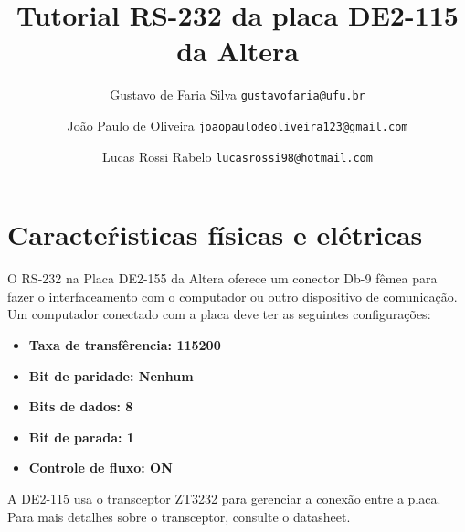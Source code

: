 \documentclass[12pt]{article} %
\begin{document}
\title{Tutorial RS-232 da placa DE2-115 da Altera\vspace{3.5cm}} %

\author{
	Gustavo de Faria Silva
	\texttt{gustavofaria@ufu.br}
	\and
	João Paulo de Oliveira
	\texttt{joaopaulodeoliveira123@gmail.com}
	\and
	Lucas Rossi Rabelo
	\texttt{lucasrossi98@hotmail.com}
	\vspace*{10cm}
}

%
\maketitle %


\tableofcontents %
\pagebreak %
\section*{Caracteŕisticas físicas e elétricas}
O RS-232 na Placa DE2-155 da Altera oferece um conector Db-9 fêmea para fazer o interfaceamento com o computador ou outro dispositivo de comunicação. Um computador conectado com a placa deve ter as seguintes configurações:
\begin{itemize}
	\item \bf{Taxa de transfêrencia:} 115200
    \item \bf{Bit de paridade:} Nenhum
    \item \bf{Bits de dados:} 8
    \item \bf{Bit de parada:} 1
    \item \bf{Controle de fluxo:} ON
\end{itemize}
A DE2-115 usa o transceptor ZT3232 para gerenciar a conexão entre a placa. Para mais detalhes sobre o transceptor, consulte o datasheet. 
\end{document}
